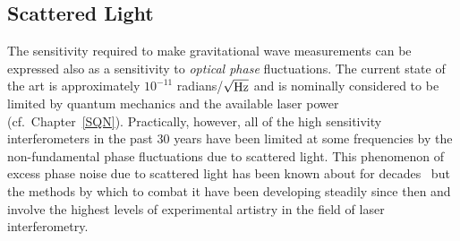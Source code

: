 






%


\subsection{Scattered Light}
\label{s:IDC:scatter}
The sensitivity required to make gravitational wave measurements can
be expressed also as a sensitivity to \textit{optical phase} fluctuations.
The current state of the art is approximately
$10^{-11}$ radians/$\sqrt{\rm Hz}$ and is nominally considered to be
limited by quantum mechanics and the available laser power (cf.~Chapter~\ref{SQN}). Practically, however, all of the high
sensitivity interferometers in the past 30 years have been limited
at some frequencies by the non-fundamental phase fluctuations due to
scattered light. This phenomenon of excess phase noise due to scattered
light has been known about for decades~\cite{Schilling:1981} but
the methods by which to combat it have been developing steadily since
then and involve the highest levels of experimental artistry in the
field of laser interferometry.

